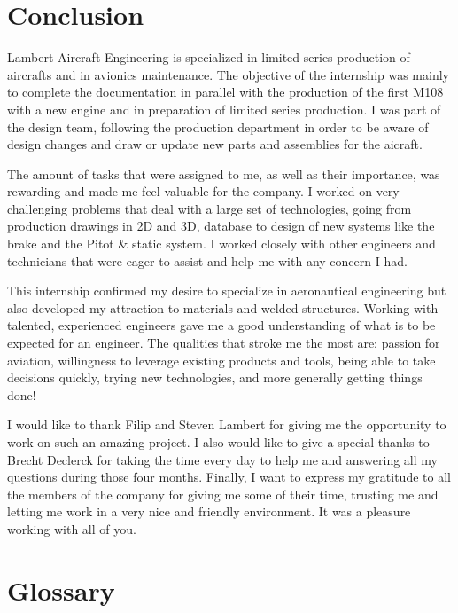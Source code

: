 \documentclass[11pt,a4paper]{article}
\begin{document}
\newpage

\section{Conclusion}
Lambert Aircraft Engineering is specialized in limited series production of aircrafts and in avionics maintenance. The objective of the internship was mainly to complete the documentation in parallel with the production of the first M108 with a new engine and in preparation of limited series production. I was part of the design team, following the production department in order to be aware of design changes and draw or update new parts and assemblies for the aicraft.

\bigskip

The amount of tasks that were assigned to me, as well as their importance, was rewarding and made me feel valuable for the company. I worked on very challenging problems that deal with a large set of technologies, going from production drawings in 2D and 3D, database to design of new systems like the brake and the Pitot \& static system. I worked closely with other engineers and technicians that were eager to assist and help me with any concern I had.

\bigskip

This internship confirmed my desire to specialize in aeronautical engineering but also developed my attraction to materials and welded structures. Working with talented, experienced engineers gave me a good understanding of what is to be expected for an engineer. The qualities that stroke me the most are: passion for aviation, willingness to leverage existing products and tools, being able to take decisions quickly, trying new technologies, and more generally getting things done!

\bigskip

I would like to thank Filip and Steven Lambert for giving me the opportunity to work on such an amazing project. I also would like to give a special thanks to Brecht Declerck for taking the time every day to help me and answering all my questions during those four months. Finally, I want to express my gratitude to all the members of the company for giving me some of their time, trusting me and letting me work in a very nice and friendly environment. It was a pleasure working with all of you.

\newpage

\section{Glossary} 
\label{sec:glossary}
\end{document}
